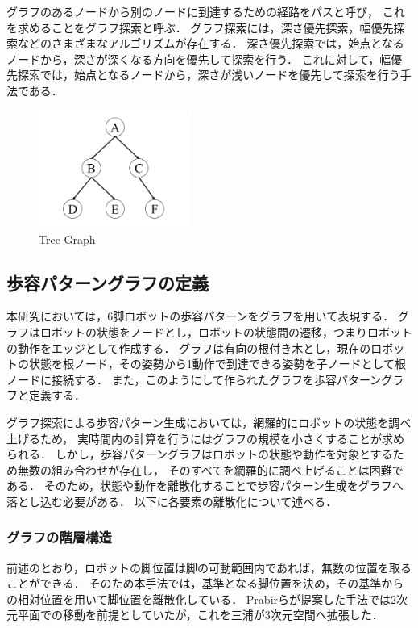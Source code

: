 グラフのあるノードから別のノードに到達するための経路をパスと呼び，
これを求めることをグラフ探索と呼ぶ．
グラフ探索には，深さ優先探索，幅優先探索などのさまざまなアルゴリズムが存在する．
深さ優先探索では，始点となるノードから，深さが深くなる方向を優先して探索を行う．
これに対して，幅優先探索では，始点となるノードから，深さが浅いノードを優先して探索を行う手法である．

\begin{figure}[htbp]
  \begin{center}
    \includegraphics[width=50mm, clip]{figure/tree_graph.png}
    \caption{Tree Graph}
    \label{fig:tree_graph} %
  \end{center}
\end{figure}

\subsection{歩容パターングラフの定義}
本研究においては，6脚ロボットの歩容パターンをグラフを用いて表現する．
グラフはロボットの状態をノードとし，ロボットの状態間の遷移，つまりロボットの動作をエッジとして作成する．
グラフは有向の根付き木とし，現在のロボットの状態を根ノード，その姿勢から1動作で到達できる姿勢を子ノードとして根ノードに接続する．
また，このようにして作られたグラフを歩容パターングラフと定義する．

グラフ探索による歩容パターン生成においては，網羅的にロボットの状態を調べ上げるため，
実時間内の計算を行うにはグラフの規模を小さくすることが求められる．
しかし，歩容パターングラフはロボットの状態や動作を対象とするため無数の組み合わせが存在し，
そのすべてを網羅的に調べ上げることは困難である．
そのため，状態や動作を離散化することで歩容パターン生成をグラフへ落とし込む必要がある．
以下に各要素の離散化について述べる．

\subsubsection{グラフの階層構造}
前述のとおり，ロボットの脚位置は脚の可動範囲内であれば，無数の位置を取ることができる．
そのため本手法では，基準となる脚位置を決め，その基準からの相対位置を用いて脚位置を離散化している．
Prabirらが提案した手法では2次元平面での移動を前提としていたが\cite{Prabir_Graph_search}，これを三浦が3次元空間へ拡張した\cite{Miura_Graph_search}．

